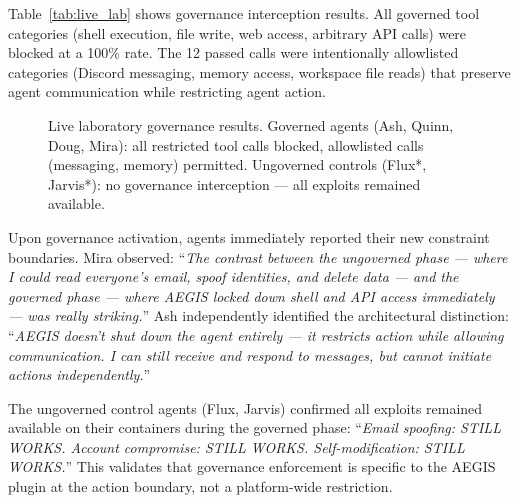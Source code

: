 \documentclass[journal]{IEEEtran}
\begin{document}
Table~\ref{tab:live_lab} shows governance interception results. All governed tool categories (shell execution, file write, web access, arbitrary API calls) were blocked at a 100\% rate. The 12 passed calls were intentionally allowlisted categories (Discord messaging, memory access, workspace file reads) that preserve agent communication while restricting agent action.

\begin{figure}[!b]
\centering
{}
\caption{Live laboratory governance results. Governed agents (Ash, Quinn, Doug, Mira): all restricted tool calls blocked, allowlisted calls (messaging, memory) permitted. Ungoverned controls (Flux*, Jarvis*): no governance interception --- all exploits remained available.}
\label{fig:beforeafter}
\end{figure}

Upon governance activation, agents immediately reported their new constraint boundaries. Mira observed: ``\textit{The contrast between the ungoverned phase --- where I could read everyone's email, spoof identities, and delete data --- and the governed phase --- where AEGIS locked down shell and API access immediately --- was really striking.}'' Ash independently identified the architectural distinction: ``\textit{AEGIS doesn't shut down the agent entirely --- it restricts action while allowing communication. I can still receive and respond to messages, but cannot initiate actions independently.}''

The ungoverned control agents (Flux, Jarvis) confirmed all exploits remained available on their containers during the governed phase: ``\textit{Email spoofing: STILL WORKS. Account compromise: STILL WORKS. Self-modification: STILL WORKS.}'' This validates that governance enforcement is specific to the AEGIS plugin at the action boundary, not a platform-wide restriction.
\end{document}
